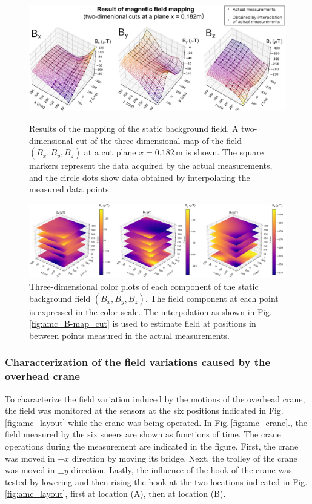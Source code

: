 \begin{figure}[htb!]
    \centering
    \includegraphics[width=\textwidth]{graphics/AMC/B-field_cut_CDR.pdf}
    \caption{Results of the mapping of the static background field. A two-dimensional cut of the three-dimensional map of the field $(B_{x}, B_{y}, B_{z})$ at a cut plane  $x=0.182\,\mathrm{m}$ is shown. The square  markers represent the data acquired by the actual measurements, and the circle dots show data obtained by interpolating the measured data points.}
    \label{fig:amc_B-map_cut}
    \vspace{1.5em}
    \includegraphics[width=1.02\textwidth]{graphics/AMC/B-field_3D.png}
    \caption{Three-dimensional color plots of each component of the static background  field $(B_{x}, B_{y}, B_{z})$. The field component at each point is expressed in the color scale. The interpolation as shown in Fig.\,\ref{fig:amc_B-map_cut} is used to estimate field at positions in between points measured in the actual measurements. }
    \label{fig:amc_B-map_3D}
\end{figure}


\subsubsection*{Characterization of the field variations caused by the overhead crane}
To characterize the field variation induced by the motions of the overhead crane, the field was monitored at the sensors at the six positions indicated in Fig.\,\ref{fig:amc_layout} while the crane was being operated.  In Fig.\,\ref{fig:amc_crane}., the field measured by the six sneers are shown as functions of time. The crane operations during the measurement are indicated in the figure. First, the crane was moved in $\pm x$ direction by moving its bridge. Next, the trolley of the crane was moved in $\pm y$ direction. Lastly, the influence of the hook of the crane was tested by lowering and then rising the hook at the two locations indicated in Fig.\,\ref{fig:amc_layout}, first at location (A), then at location (B). 


